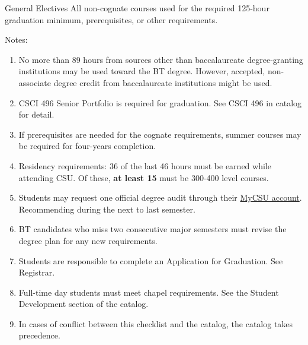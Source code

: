 \begin{reqgroup}{General Electives}
All non-cognate courses used for the required 125-hour graduation minimum, prerequisites, or other requirements.
\end{reqgroup}

Notes:%
\begin{enumerate}\footnotesize
	\item No more than 89 hours from sources other than baccalaureate degree-granting institutions may be used toward the BT degree. However, accepted, non-associate degree credit from baccalaureate institutions might be used.
	\item CSCI 496 Senior Portfolio is required for graduation. See CSCI 496 in catalog for detail.
	\item If prerequisites are needed for the cognate requirements, summer courses may be required for four-years completion.
	\item Residency requirements: 36 of the last 46 hours must be earned while attending CSU. Of these, \textbf{at least 15} must be 300-400 level courses.
	\item Students may request one official degree audit through their \href{https://portal.csuniv.edu/}{MyCSU account}. Recommending during the next to last semester.
	\item BT candidates who miss two consecutive major semesters must revise the degree plan for any new requirements.
	\item Students are responsible to complete an Application for Graduation. See Registrar.
	\item Full-time day students must meet chapel requirements. See the Student Development section of the catalog.
	\item In cases of conflict between this checklist and the catalog, the catalog takes precedence.
\end{enumerate}